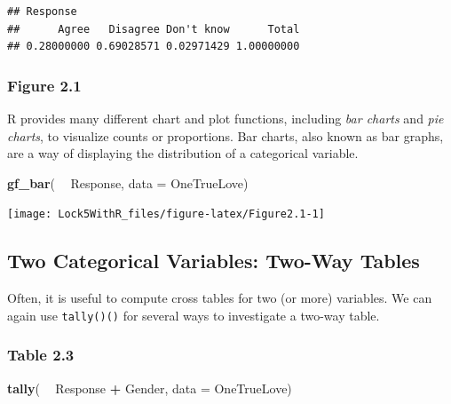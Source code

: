 \documentclass[]{book}
\newenvironment{Shaded}{\begin{snugshade}}{\end{snugshade}}
\newcommand{\DataTypeTok}[1]{\textcolor[rgb]{0.13,0.29,0.53}{#1}}
\newcommand{\KeywordTok}[1]{\textcolor[rgb]{0.13,0.29,0.53}{\textbf{#1}}}
\newcommand{\NormalTok}[1]{#1}
\newcommand{\OperatorTok}[1]{\textcolor[rgb]{0.81,0.36,0.00}{\textbf{#1}}}
\newcommand{\StringTok}[1]{\textcolor[rgb]{0.31,0.60,0.02}{#1}}
\begin{document}
\begin{verbatim}
## Response
##      Agree   Disagree Don't know      Total 
## 0.28000000 0.69028571 0.02971429 1.00000000
\end{verbatim}

\hypertarget{figure-2.1}{%
\subsubsection{Figure 2.1}\label{figure-2.1}}

R provides many different chart and plot functions, including \emph{bar charts} and \emph{pie charts}, to visualize counts or proportions. Bar charts, also known as bar graphs, are a way of displaying the distribution of a categorical variable.

\begin{Shaded}
\begin{Highlighting}[]
\KeywordTok{gf_bar}\NormalTok{( }\OperatorTok{~}\StringTok{ }\NormalTok{Response, }\DataTypeTok{data =}\NormalTok{ OneTrueLove)}
\end{Highlighting}
\end{Shaded}

\texttt{[image: Lock5WithR\_files/figure-latex/Figure2.1-1]}

\hypertarget{two-categorical-variables-two-way-tables}{%
\subsection{Two Categorical Variables: Two-Way Tables}\label{two-categorical-variables-two-way-tables}}

Often, it is useful to compute cross tables for two (or more) variables. We can again use \texttt{tally()()} for several ways to investigate a two-way table.

\hypertarget{table-2.3}{%
\subsubsection{Table 2.3}\label{table-2.3}}

\begin{Shaded}
\begin{Highlighting}[]
\KeywordTok{tally}\NormalTok{( }\OperatorTok{~}\StringTok{ }\NormalTok{Response }\OperatorTok{+}\StringTok{ }\NormalTok{Gender, }\DataTypeTok{data =}\NormalTok{ OneTrueLove)}
\end{Highlighting}
\end{Shaded}
\end{document}
